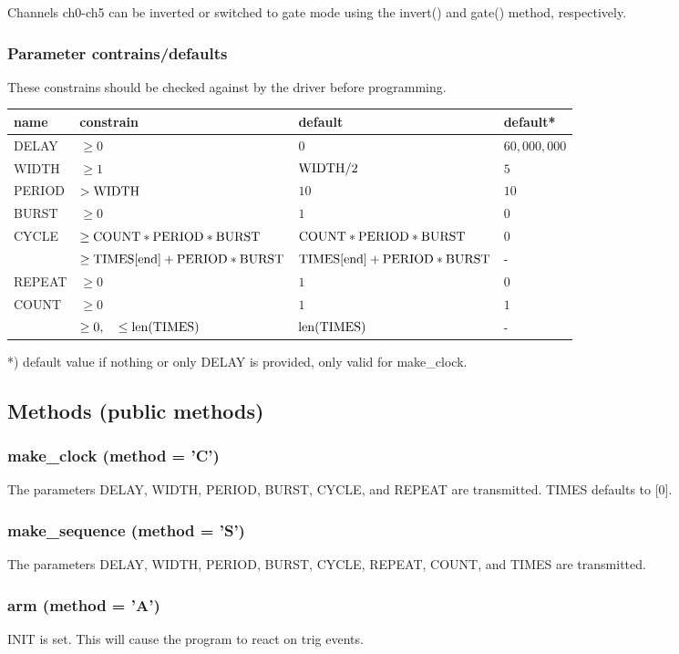 \documentclass{article}
\begin{document}
Channels ch0-ch5 can be inverted or switched to gate mode using the invert() and gate() method, respectively. 

\subsubsection*{Parameter contrains/defaults}
These constrains should be checked against by the driver before programming.\\
\begin{tabular}{llll}
name  &constrain&default&default*\\\hline
DELAY &$\geq0$&$0$&$60,000,000$\\
WIDTH &$\geq1$&$\rm{WIDTH}/2$&$5$\\
PERIOD&$>\rm{WIDTH}$&$10$&$10$\\
BURST&$\geq0$&$1$&$0$\\
CYCLE &$\geq\rm{COUNT}*\rm{PERIOD}*\rm{BURST}$&$\rm{COUNT}*\rm{PERIOD}*\rm{BURST}$&$0$\\
&$\geq\rm{TIMES[end]}+\rm{PERIOD}*\rm{BURST}$&$\rm{TIMES[end]}+\rm{PERIOD}*\rm{BURST}$&-\\
REPEAT&$\geq0$&$1$&$0$\\
COUNT &$\geq0$&$1$&$1$\\
 &$\geq0,\quad \leq \rm{len}(\rm{TIMES})$&$\rm{len}(\rm{TIMES})$&-\\
\end{tabular}

*) default value if nothing or only DELAY is provided, only valid for make\_clock.


\subsection*{Methods (public methods)}
\subsubsection*{make\_clock (method = 'C')}
The parameters DELAY, WIDTH, PERIOD, BURST, CYCLE, and REPEAT are transmitted. TIMES defaults to [0].
\subsubsection*{make\_sequence (method = 'S')}
The parameters DELAY, WIDTH, PERIOD, BURST, CYCLE, REPEAT, COUNT, and TIMES are transmitted.
\subsubsection*{arm (method = 'A')}
INIT is set. This will cause the program to react on trig events.
\end{document}
